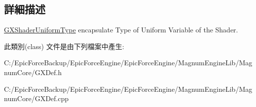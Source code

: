 \subsection{詳細描述}
\hyperlink{class_magnum_1_1_g_x_shader_uniform_type}{G\+X\+Shader\+Uniform\+Type} encapsulate Type of Uniform Variable of the Shader. 

此類別(class) 文件是由下列檔案中產生\+:\begin{DoxyCompactItemize}
\item 
C\+:/\+Epic\+Force\+Backup/\+Epic\+Force\+Engine/\+Epic\+Force\+Engine/\+Magnum\+Engine\+Lib/\+Magnum\+Core/G\+X\+Def.\+h\item 
C\+:/\+Epic\+Force\+Backup/\+Epic\+Force\+Engine/\+Epic\+Force\+Engine/\+Magnum\+Engine\+Lib/\+Magnum\+Core/G\+X\+Def.\+cpp\end{DoxyCompactItemize}
